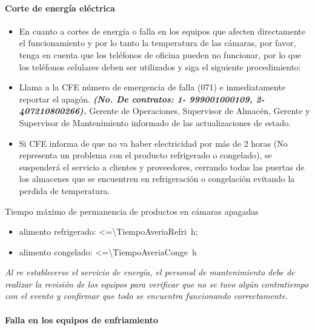 \paragraph{Corte de energía eléctrica}
\begin{itemize}
\item En cuanto a cortes de energía o falla en los equipos que afecten directamente el funcionamiento y por lo tanto la temperatura de las cámaras, por favor, tenga en cuenta que los teléfonos de oficina pueden no funcionar, por lo que los teléfonos celulares deben ser utilizados y siga el siguiente procedimiento:
\item Llama a la CFE número de emergencia de falla (071) e inmediatamente reportar el apagón. \emph{\textbf{(No. De contratos: 1- 999001000109, 2- 407210800266).}} Gerente de Operaciones, Supervisor de Almacén, Gerente y Supervisor de Mantenimiento informado de las actualizaciones de estado.
\item Si CFE informa de que no va haber electricidad por más de 2 horas (No representa un problema con el producto refrigerado o congelado), se suspenderá el servicio a clientes y proveedores, cerrando todas las puertas de los almacenes que se encuentren en refrigeración o congelación evitando la perdida de temperatura.
\end{itemize}

\begin{nota}{Tiempo máximo de permanencia de productos en cámaras apagadas}
\begin{itemize}
\item \Gls{alimento} refrigerado: \qty{<=\TiempoAveriaRefri}{\hour};
\item \Gls{alimento} congelado: \qty{<=\TiempoAveriaConge}{\hour}
\end{itemize}
\end{nota}
\emph{Al re establecerse el servicio de energía, el personal de mantenimiento debe de realizar la revisión de los equipos para verificar que no se tuvo algún contratiempo con el evento y confirmar que todo se encuentra funcionando correctamente.}

\paragraph{Falla en los equipos de enfriamiento}

